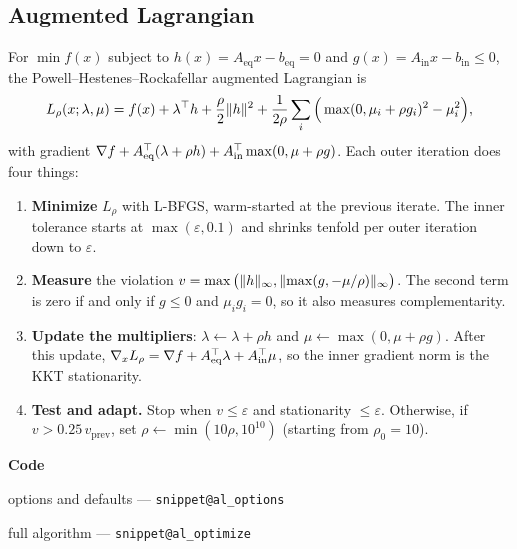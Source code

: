 \documentclass[11pt,a4paper]{article}
\makeatletter
\newcommand{\snippetsource}[1]{\csname snippet@#1\endcsname}
\newcommand{\snippet}[3]{%
  }
\newenvironment{codepointers}{%
  \par\smallskip\begingroup\footnotesize\noindent\textcolor{blue!50!black}{\textbf{Code}}\par\nopagebreak
  \begin{list}{}{\setlength{\leftmargin}{1.2em}\setlength{\itemsep}{0pt}\setlength{\parsep}{0pt}\setlength{\topsep}{1pt}}}%
  {\end{list}\endgroup\smallskip}
\newcommand{\codeitem}[2]{\item #2 --- \texttt{\snippetsource{#1}}}
\makeatother
\begin{document}
\subsection{Augmented Lagrangian}\label{sec:al}
For $\min f(x)$ subject to $h(x)=A_{\text{eq}}x-b_{\text{eq}}=0$ and
$g(x)=A_{\text{in}}x-b_{\text{in}}\le0$, the Powell--Hestenes--Rockafellar augmented
Lagrangian is
\[
  L_\rho(x;\lambda,\mu)=f(x)+\lambda^\top h+\frac\rho2\lVert h\rVert^2
  +\frac1{2\rho}\sum_i\Big(\max(0,\mu_i+\rho g_i)^2-\mu_i^2\Big),
\]
with gradient
$\nabla f+A_{\text{eq}}^\top(\lambda+\rho h)+A_{\text{in}}^\top\max(0,\mu+\rho g)$.
Each outer iteration does four things:
\begin{enumerate}
  \item \textbf{Minimize} $L_\rho$ with L-BFGS, warm-started at the previous iterate. The
        inner tolerance starts at $\max(\varepsilon,0.1)$ and shrinks tenfold per outer
        iteration down to $\varepsilon$.
  \item \textbf{Measure} the violation
        $v=\max\big(\lVert h\rVert_\infty,\lVert \max(g,-\mu/\rho)\rVert_\infty\big)$. The second term is
        zero if and only if $g\le0$ and $\mu_ig_i=0$, so it also measures complementarity.
  \item \textbf{Update the multipliers}: $\lambda\leftarrow\lambda+\rho h$ and
        $\mu\leftarrow\max(0,\mu+\rho g)$. After this update,
        $\nabla_xL_\rho=\nabla f+A_{\text{eq}}^\top\lambda+A_{\text{in}}^\top\mu$, so the inner
        gradient norm is the KKT stationarity.
  \item \textbf{Test and adapt.} Stop when $v\le\varepsilon$ and stationarity
        $\le\varepsilon$. Otherwise, if $v>0.25\,v_{\text{prev}}$, set
        $\rho\leftarrow\min(10\rho,10^{10})$ (starting from $\rho_0=10$).
\end{enumerate}
\snippet{al_function}{C++}{Augmented Lagrangian value and gradient}
\snippet{al_updates}{C++}{Multiplier and penalty updates}
\begin{codepointers}
  \codeitem{al_options}{options and defaults}
  \codeitem{al_optimize}{full algorithm}
\end{codepointers}
\end{document}
